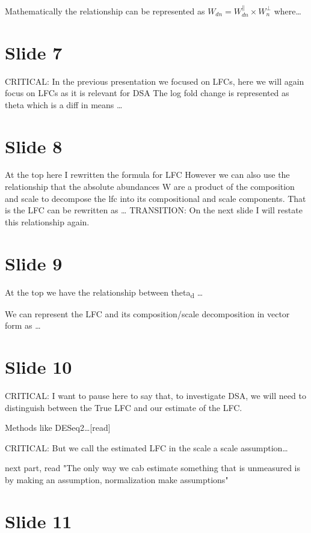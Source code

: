 \documentclass[11pt]{article}
\begin{document}
Mathematically the relationship can be represented as \(W_{dn}=W^\parallel_{dn} \times W^\perp_n\) where\ldots{}

\section{Slide 7}
\label{sec:org700a369}

CRITICAL: In the previous presentation we focused on LFCs, here we will again focus on LFCs as it is relevant for DSA
The log fold change is represented as theta which is a diff in means \ldots{}

\section{Slide 8}
\label{sec:org8ded843}

At the top here I rewritten the formula for LFC
However we can also use the relationship that the absolute abundances W are a product of the composition and scale
  to decompose the lfc into its compositional and scale components. That is the LFC can be rewritten as \ldots{}
TRANSITION: On the next slide I will restate this relationship again.

\section{Slide 9}
\label{sec:org95fb9db}

At the top we have the relationship between theta\textsubscript{d} \ldots{}

We can represent the LFC and its composition/scale decomposition in vector form as \ldots{}

\section{Slide 10}
\label{sec:orgc3f266a}

CRITICAL: I want to pause here to say that, to investigate DSA, we will need to distinguish between the True LFC and our estimate of the LFC.

Methods like DESeq2\ldots{}[read]

CRITICAL: But we call the estimated LFC in the scale a scale assumption\ldots{}

next part, read "The only way we cab estimate something that is unmeasured is by making an assumption, normalization make assumptions"

\section{Slide 11}
\label{sec:org7ca8440}
\end{document}
